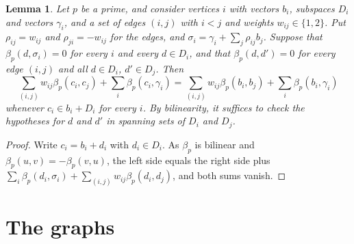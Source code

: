 \documentclass[11pt]{article}
\newtheorem{lemma}[theorem]{Lemma}
\begin{document}
\begin{lemma}\label{lem:envelope}
Let $p$ be a prime, and consider vertices $i$ with vectors $b_i$, subspaces $D_i$ and vectors $\gamma_i$, and a set of edges $(i,j)$ with $i<j$ and weights $w_{ij}\in\{1,2\}$. Put $\rho_{ij}=w_{ij}$ and $\rho_{ji}=-w_{ij}$ for the edges, and $\sigma_i=\gamma_i+\sum_j\rho_{ij}b_j$. Suppose that $\beta_p(d,\sigma_i)=0$ for every $i$ and every $d\in D_i$, and that $\beta_p(d,d')=0$ for every edge $(i,j)$ and all $d\in D_i$, $d'\in D_j$. Then
\[
\sum_{(i,j)}w_{ij}\beta_p(c_i,c_j)+\sum_i\beta_p(c_i,\gamma_i)=\sum_{(i,j)}w_{ij}\beta_p(b_i,b_j)+\sum_i\beta_p(b_i,\gamma_i)
\]
whenever $c_i\in b_i+D_i$ for every $i$. By bilinearity, it suffices to check the hypotheses for $d$ and $d'$ in spanning sets of $D_i$ and $D_j$.
\end{lemma}

\begin{proof}
Write $c_i=b_i+d_i$ with $d_i\in D_i$. As $\beta_p$ is bilinear and $\beta_p(u,v)=-\beta_p(v,u)$, the left side equals the right side plus $\sum_i\beta_p(d_i,\sigma_i)+\sum_{(i,j)}w_{ij}\beta_p(d_i,d_j)$, and both sums vanish.
\end{proof}
\section{The graphs}
\end{document}
